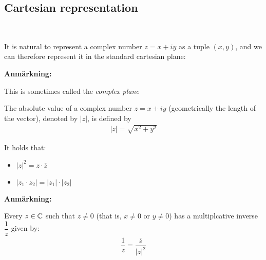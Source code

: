 \subsection{Cartesian representation}\hfill\\\par
\noindent It is natural to represent a complex number $z = x+iy$ as a tuple $(x,y)$, and we can therefore represent it in the standard cartesian plane:

\begin{center}
\end{center}
\par\bigskip
\noindent\textbf{Anmärkning:}\par
\noindent This is sometimes called the \textit{complex plane}
\par\bigskip
\begin{theo}{}
  The absolute value of a complex number $z = x+iy$ (geometrically the length of the vector), denoted by $\left|z\right|$, is defined by
  \begin{equation*}
    \begin{gathered}
      \left|z\right| = \sqrt{x^2+y^2}
    \end{gathered}
  \end{equation*}
  \par\bigskip
  \noindent It holds that:\par
  \begin{itemize}
    \item $\left|z\right|^2 = z\cdot\overline{z}$
    \item $\left|z_1\cdot z_2\right| = \left|z_1\right|\cdot\left|z_2\right|$
  \end{itemize}
\end{theo}
\par\bigskip
\noindent\textbf{Anmärkning:}\par
\noindent Every $z\in\mathbb{C}$ such that  $z\neq0$ (that is, $x\neq0$ or $y\neq0$) has a multiplcative inverse $\dfrac{1}{z}$ given by:
\begin{equation*}
  \begin{gathered}
    \dfrac{1}{z}= \dfrac{\overline{z}}{\left|z\right|^2}
  \end{gathered}
\end{equation*}

